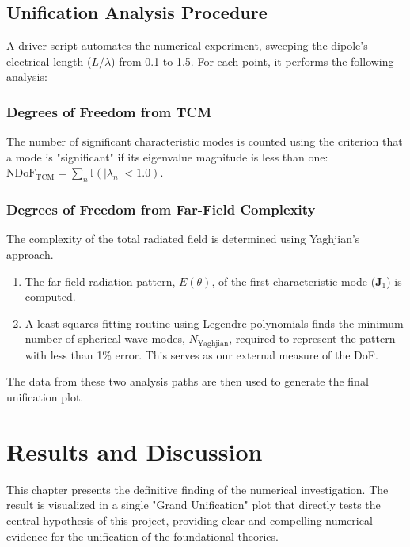 \documentclass[11pt, a4paper]{report}
\begin{document}
\section{Unification Analysis Procedure}
A driver script automates the numerical experiment, sweeping the dipole's electrical length ($L/\lambda$) from 0.1 to 1.5. For each point, it performs the following analysis:

\subsection{Degrees of Freedom from TCM}
The number of significant characteristic modes is counted using the criterion that a mode is "significant" if its eigenvalue magnitude is less than one: $\text{NDoF}_{\text{TCM}} = \sum_n \mathbb{I}(|\lambda_n| < 1.0)$.

\subsection{Degrees of Freedom from Far-Field Complexity}
The complexity of the total radiated field is determined using Yaghjian's approach.
\begin{enumerate}
    \item The far-field radiation pattern, $E(\theta)$, of the first characteristic mode ($\mathbf{J}_1$) is computed.
    \item A least-squares fitting routine using Legendre polynomials finds the minimum number of spherical wave modes, $N_{\text{Yaghjian}}$, required to represent the pattern with less than 1\% error. This serves as our external measure of the DoF.
\end{enumerate}
The data from these two analysis paths are then used to generate the final unification plot.

\newpage

\chapter{Results and Discussion} \label{ch:results}

This chapter presents the definitive finding of the numerical investigation. The result is visualized in a single "Grand Unification" plot that directly tests the central hypothesis of this project, providing clear and compelling numerical evidence for the unification of the foundational theories.
\end{document}
